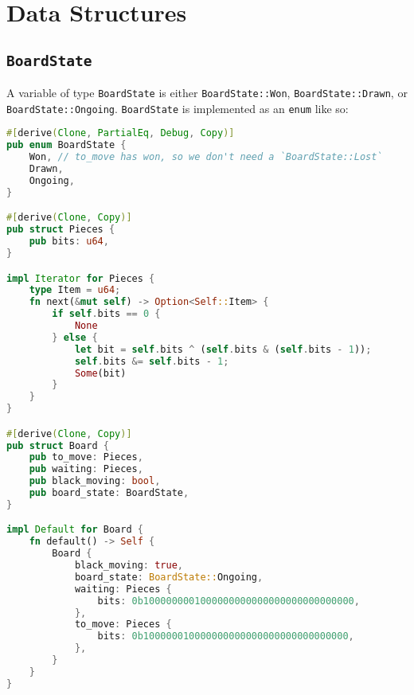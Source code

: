 \documentclass[12pt, a4paper]{report}
\begin{document}
\section{Data Structures}
\subsection{\texttt{BoardState}}
A variable of type \texttt{BoardState} is either \texttt{BoardState::Won}, \texttt{BoardState::Drawn}, or \texttt{BoardState::Ongoing}.
\texttt{BoardState} is implemented as an \texttt{enum} like so:

\begin{lstlisting}[language=Rust]
#[derive(Clone, PartialEq, Debug, Copy)]
pub enum BoardState {
    Won, // to_move has won, so we don't need a `BoardState::Lost`
    Drawn,
    Ongoing,
}

#[derive(Clone, Copy)]
pub struct Pieces {
    pub bits: u64,
}

impl Iterator for Pieces {
    type Item = u64;
    fn next(&mut self) -> Option<Self::Item> {
        if self.bits == 0 {
            None
        } else {
            let bit = self.bits ^ (self.bits & (self.bits - 1));
            self.bits &= self.bits - 1;
            Some(bit)
        }
    }
}

#[derive(Clone, Copy)]
pub struct Board {
    pub to_move: Pieces,
    pub waiting: Pieces,
    pub black_moving: bool,
    pub board_state: BoardState,
}

impl Default for Board {
    fn default() -> Self {
        Board {
            black_moving: true,
            board_state: BoardState::Ongoing,
            waiting: Pieces {
                bits: 0b1000000001000000000000000000000000000,
            },
            to_move: Pieces {
                bits: 0b100000010000000000000000000000000000,
            },
        }
    }
}

\end{lstlisting}
\end{document}
